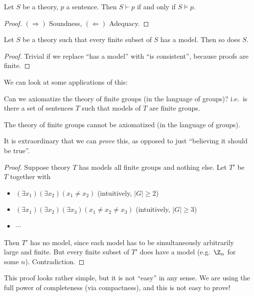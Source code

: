 \documentclass[a4paper]{article}
\begin{document}
\begin{thm}
  Let $S$ be a theory, $p$ a sentence. Then $S\vdash p$ if and only if $S \models p$.
\end{thm}

\begin{proof}
  $(\Rightarrow)$ Soundness, $(\Leftarrow)$ Adequacy.
\end{proof}

\begin{cor}
  Let $S$ be a theory such that every finite subset of $S$ has a model. Then so does $S$.
\end{cor}

\begin{proof}
  Trivial if we replace ``has a model'' with ``is consistent'', because proofs are finite.
\end{proof}

We can look at some applications of this:

Can we axiomatize the theory of finite groups (in the language of groups)? i.e.\ is there a set of sentences $T$ such that models of $T$ are finite groups.

\begin{cor}
  The theory of finite groups cannot be axiomatized (in the language of groups).
\end{cor}
It is extraordinary that we can \emph{prove} this, as opposed to just ``believing it should be true''.

\begin{proof}
  Suppose theory $T$ has models all finite groups and nothing else. Let $T'$ be $T$ together with
  \begin{itemize}
    \item $(\exists x_1)(\exists x_2)(x_1 \not = x_2)$ (intuitively, $|G| \geq 2$)
    \item $(\exists x_1)(\exists x_2)(\exists x_3)(x_1 \not= x_2 \not= x_3)$ (intuitively, $|G| \geq 3$)
    \item $\cdots$
  \end{itemize}
  Then $T'$ has no model, since each model has to be simultaneously arbitrarily large and finite. But every finite subset of $T'$ does have a model (e.g.\ $\Z_n$ for some $n$). Contradiction.
\end{proof}
This proof looks rather simple, but it is not ``easy'' in any sense. We are using the full power of completeness (via compactness), and this is not easy to prove!
\end{document}
